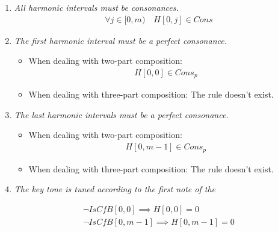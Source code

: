\begin{enumerate}[wide, label=\bfseries 1.H\arabic*]
  \item\label{rule:allcons-appendix}{\textit{All harmonic intervals must be consonances.}} 
\begin{equation}
    \begin{gathered}
        \forall j \in [0, m)\quad 
        H[0, j] \in Cons
    \end{gathered}
\end{equation}

\item\label{rule:firstpcons}{\textit{The first harmonic interval must be a perfect consonance.}}

\begin{itemize} \item  When dealing with two-part composition:\begin{equation}
    \begin{gathered}
        H[0, 0] \in Cons_{p}
    \end{gathered}
\end{equation}
\item When dealing with three-part composition: The rule doesn't exist.
\end{itemize}

\item\label{rule:lastpcons}{\textit{The last harmonic intervals must be a perfect consonance.}}

\begin{itemize} \item  When dealing with two-part composition:\begin{equation}
  \begin{gathered}
      H[0, m-1] \in Cons_{p}
  \end{gathered}
\end{equation}
\item When dealing with three-part composition: The rule doesn't exist.
\end{itemize}

\item\label{rule:keytone}{\textit{The key tone is tuned according to the first note of the \cfdot}}

\begin{equation}
    \begin{gathered}
        \lnot \mathit{IsCfB}[0, 0] \implies H[0, 0] = 0\\
        \lnot \mathit{IsCfB}[0, m-1] \implies H[0, m-1] = 0
    \end{gathered}
\end{equation}


\end{enumerate}
